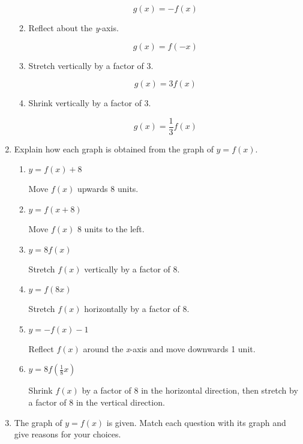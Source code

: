 \documentclass{article}
\begin{document}
\begin{enumerate}
\begin{enumerate}
				$$g(x) = -f(x)$$

			\item Reflect about the \emph{y}-axis.
			
				$$g(x) = f(-x)$$
				
			\item Stretch vertically by a factor of 3.
			
				$$g(x) = 3 f(x)$$
				
			\item Shrink vertically by a factor of 3.
			
				$$g(x) = \frac{1}{3} f(x)$$
		\end{enumerate}
		
		\item Explain how each graph is obtained from the graph of $y = f(x)$.
		
		\begin{enumerate}
		
			\item $y = f(x) + 8$
			
				Move $f(x)$ upwards 8 units.

			\item $y = f(x + 8)$
			
				Move $f(x)$ 8 units to the left.
				
			\item $y = 8f(x)$
			
				Stretch $f(x)$ vertically by a factor of 8.
				
			\item $y = f(8x)$
			
				Stretch $f(x)$ horizontally by a factor of 8.
				
			\item $y = -f(x) - 1$
			
				Reflect $f(x)$ around the \emph{x}-axis and move downwards 1 unit.

			\item $y = 8f(\frac{1}{8}x)$
			
				Shrink $f(x)$ by a factor of 8 in the horizontal direction, then stretch by a
				factor of 8 in the vertical direction.
		\end{enumerate}
		
		\item The graph of $y = f(x)$ is given. Match each question with its graph and give reasons for
			your choices.
			
		\begin{enumerate}
		

\end{enumerate}
\end{enumerate}
\end{document}

